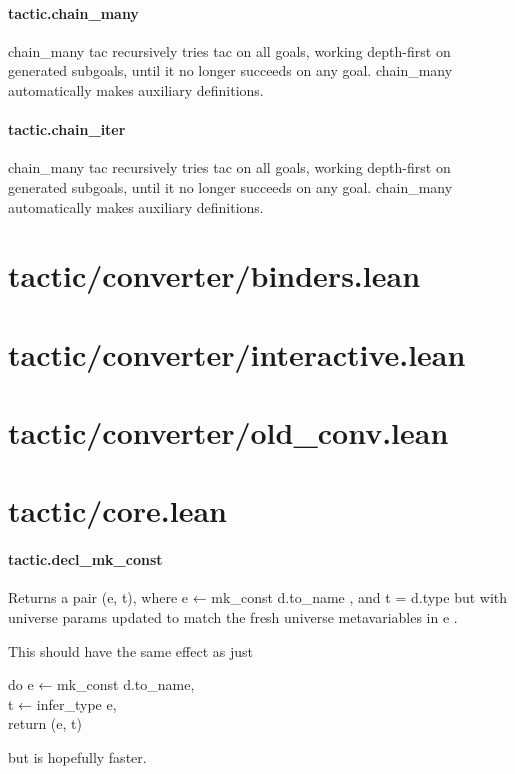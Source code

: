 \documentclass{article}
\begin{document}
\paragraph{tactic.chain\_many}
\par
\colorbox[RGB]{253,246,227}{{{{\color[RGB]{101, 123, 131} chain\_many tac }}}} recursively tries 
\colorbox[RGB]{253,246,227}{{{{\color[RGB]{101, 123, 131} tac }}}} on all goals, working depth-first on generated subgoals,
until it no longer succeeds on any goal. 
\colorbox[RGB]{253,246,227}{{{{\color[RGB]{101, 123, 131} chain\_many }}}} automatically makes auxiliary definitions.
\paragraph{tactic.chain\_iter}
\par
\colorbox[RGB]{253,246,227}{{{{\color[RGB]{101, 123, 131} chain\_many tac }}}} recursively tries 
\colorbox[RGB]{253,246,227}{{{{\color[RGB]{101, 123, 131} tac }}}} on all goals, working depth-first on generated subgoals,
until it no longer succeeds on any goal. 
\colorbox[RGB]{253,246,227}{{{{\color[RGB]{101, 123, 131} chain\_many }}}} automatically makes auxiliary definitions.
\section{tactic/converter/binders.lean}\section{tactic/converter/interactive.lean}\section{tactic/converter/old\_conv.lean}\section{tactic/core.lean}\paragraph{tactic.decl\_mk\_const}
\par
Returns a pair (e, t), where 
\colorbox[RGB]{253,246,227}{{{{\color[RGB]{101, 123, 131} e ← mk\_const d.to\_name }}}}, and 
\colorbox[RGB]{253,246,227}{{{{\color[RGB]{101, 123, 131} t  }}}{{{\color[RGB]{181, 137, 0} = }}}{{{\color[RGB]{101, 123, 131}  d.type }}}}but with universe params updated to match the fresh universe metavariables in 
\colorbox[RGB]{253,246,227}{{{{\color[RGB]{101, 123, 131} e }}}}.
\par
This should have the same effect as just
\\
\colorbox[RGB]{253,246,227}{\parbox{4.5in}{{{{\color[RGB]{133, 153, 0} do }}}{{{\color[RGB]{101, 123, 131}  e ← mk\_const d.to\_name,
 }}}\\
{{{\color[RGB]{101, 123, 131}    t ← infer\_type e,
 }}}\\
{{{\color[RGB]{101, 123, 131}    return (e, t)
 }}}\\

}}\par
but is hopefully faster.
\end{document}
